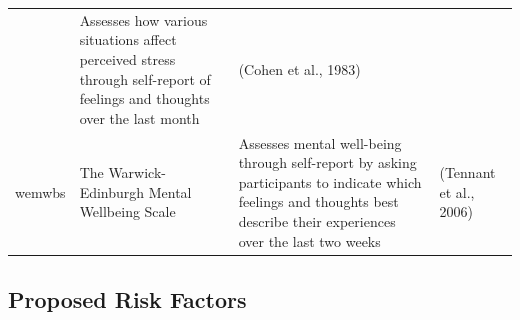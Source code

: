\documentclass[]{book}
\begin{document}
\begin{longtable}[]{@{}llll@{}}
\begin{minipage}[t]{0.27\columnwidth}
\end{minipage} & \begin{minipage}[t]{0.22\columnwidth}\raggedright
Assesses how various situations affect perceived stress through self-report of feelings and thoughts over the last month\strut
\end{minipage} & \begin{minipage}[t]{0.18\columnwidth}\raggedright
(Cohen et al., 1983)\strut
\end{minipage}\tabularnewline
\begin{minipage}[t]{0.22\columnwidth}\raggedright
wemwbs\strut
\end{minipage} & \begin{minipage}[t]{0.27\columnwidth}\raggedright
The Warwick-Edinburgh Mental Wellbeing Scale\strut
\end{minipage} & \begin{minipage}[t]{0.22\columnwidth}\raggedright
Assesses mental well-being through self-report by asking participants to indicate which feelings and thoughts best describe their experiences over the last two weeks\strut
\end{minipage} & \begin{minipage}[t]{0.18\columnwidth}\raggedright
(Tennant et al., 2006)\strut
\end{minipage}\tabularnewline
\bottomrule
\end{longtable}

\hypertarget{proposed-risk-factors}{%
\subsection{Proposed Risk Factors}\label{proposed-risk-factors}}
\end{document}
